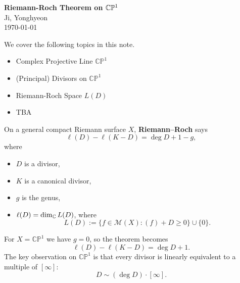 \documentclass[11pt,openany]{article}
\newenvironment{infobox}{%
	\def\FrameCommand{\fboxrule=0.8pt \fboxsep=8pt \colorbox{noteblue}}%
	\MakeFramed{\advance\hsize-\width \FrameRestore}}{\endMakeFramed}
\newcommand{\CP}{\mathbb{CP}}
\newcommand{\MM}{\mathcal{M}}
\newcommand{\degd}{\operatorname{deg}}
\newcommand{\CPone}{\CP^1}
\begin{document}
\begin{center}
	\Huge\textbf{Riemann-Roch Theorem on $\mathbb{C}\mathbb P^1$}\\
	\vspace{0.5em}
	\large{Ji, Yonghyeon}\\
	\vspace{0.5em}
	\normalsize{\today}\\
\end{center} 
\noindent 
We cover the following topics in this note.
\begin{itemize}
	\item Complex Projective Line $\CPone$
	\item (Principal) Divisors on $\CPone$
	\item Riemann-Roch Space $L(D)$
	\item TBA
\end{itemize}

\medskip

\begin{infobox}
On a general compact Riemann surface $X$, \textbf{Riemann--Roch} says
\[
\ell(D)-\ell(K-D)=\degd D+1-g,
\]
where
\begin{itemize}
	\item $D$ is a divisor,
	\item $K$ is a canonical divisor,
	\item $g$ is the genus,
	\item $\ell(D)=\dim_{\mathbb{C}} L(D)$, where
	\[
	L(D):=\{f\in \MM(X): (f)+D\ge 0\}\cup\{0\}.
	\]
\end{itemize}
For $X=\CPone$ we have $g=0$, so the theorem becomes
\[
\ell(D)-\ell(K-D)=\degd D+1.
\]
The key observation on $\CPone$ is that every divisor is linearly equivalent to a multiple of $[\infty]$: \[
D\sim(\deg D)\cdot[\infty].
\]
\end{infobox}
\newpage
\tableofcontents
\end{document}
